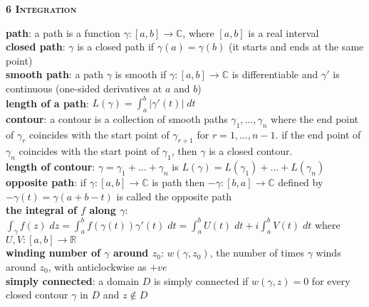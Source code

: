 \documentclass[a4paper]{article}
\newcommand*\abs[1]{\vert #1 \vert}
\begin{document}
\begin{framed}
	\begin{center}
		\textbf{\textsc{6 Integration}}
	\end{center}
	\textbf{path}: a path is a function $\gamma: [a, b] \rightarrow \mathbb{C}$, where $[a, b]$ is a real interval\\
	
	\noindent
	\textbf{closed path}: $\gamma$ is a closed path if $\gamma(a) = \gamma(b)$ (it starts and ends at the same point)\\
	
	\noindent
	\textbf{smooth path}: a path $\gamma$ is smooth if $\gamma: [a, b] \rightarrow \mathbb{C}$ is differentiable and $\gamma'$ is continuous (one-sided derivatives at $a$ and $b$)\\
	
	\noindent
	\textbf{length of a path}: $L(\gamma) = \int_a^b \abs{\gamma'(t)} \; dt$\\
	
	\noindent
	\textbf{contour}: a contour is a collection of smooth paths $\gamma_1, \dots, \gamma_n$ where the end point of $\gamma_r$ coincides with the start point of $\gamma_{r+1}$ for $r = 1, \dots, n - 1$. if the end point of $\gamma_n$ coincides with the start point of $\gamma_1$, then $\gamma$ is a closed contour.\\
	
	\noindent
	\textbf{length of contour}: $\gamma = \gamma_1 + \dots + \gamma_n$ is $L(\gamma) = L(\gamma_1) + \dots + L(\gamma_n)$\\
	
	\noindent
	\textbf{opposite path}: if $\gamma: [a, b] \rightarrow \mathbb{C}$ is path then $-\gamma: [b, a] \rightarrow \mathbb{C}$ defined by $-\gamma(t) = \gamma(a + b - t)$ is called the opposite path\\
	
	\noindent
	\textbf{the integral of $f$ along $\gamma$}: $\int_\gamma f(z) \; dz = \int_a^b f(\gamma(t))\gamma'(t) \; dt = \int_a^b U(t) \; dt + i \int_a^b V(t) \; dt$ where $U, V: [a, b] \rightarrow \mathbb{R}$\\
	
	\noindent
	\textbf{winding number of $\gamma$ around $z_0$}: $w(\gamma, z_0)$, the number of times $\gamma$ winds around $z_0$, with anticlockwise as $+ve$\\
	
	\noindent
	\textbf{simply connected}: a domain $D$ is simply connected if $w(\gamma, z) = 0$ for every closed contour $\gamma$ in $D$ and $z \notin D$\\
	

\end{framed}
\end{document}

